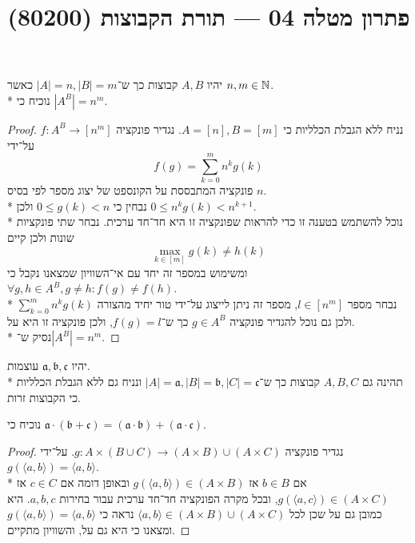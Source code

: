 
\title{פתרון מטלה 04 --- תורת הקבוצות (80200)}


\maketitle
\maketitleprint{}

\Question{}
יהיו $A, B$ קבוצות כך ש־$|A| = n, |B| = m$ כאשר $n, m \in \mathbb{N}$. \\*
נוכיח כי $|A^B| = n^m$.
\begin{proof}
	נניח ללא הגבלת הכלליות כי $A = [n], B = [m]$.
	נגדיר פונקציה $f : A^B \to [n^m]$ על־ידי
	\[
		f(g) = \sum_{k = 0}^{m} n^k g(k)
	\]
	פונקציה המתבססת על הקונספט של יצוג מספר לפי בסיס $n$. \\*
	נבחין כי $0 \le g(k) < n$ ולכן $0 \le n^k g(k) < n^{k + 1}$. \\*
	נוכל להשתמש בטענה זו כדי להראות שפונקציה זו היא חד־חד ערכית. נבחר שתי פונקציות שונות ולכן קיים
	\[
		\max_{k \in [m]} g(k) \ne h(k)
	\]
	ומשימוש במספר זה יחד עם אי־השוויון שמצאנו נקבל כי $\forall g, h \in A^B, g \ne h : f(g) \ne f(h)$. \\*
	נבחר מספר $l \in [n^m]$, מספר זה ניתן לייצוג על־ידי טור יחיד מהצורה $\sum_{k = 0}^{m} n^k g(k)$ ולכן גם נוכל להגדיר פונקציה $g \in A^B$ כך ש־$f(g) = l$, ולכן פונקציה זו היא על. \\*
	נסיק ש־$|A^B| = n^m$.
\end{proof}

\Question{}
יהיו $\mathfrak{a}, \mathfrak{b}, \mathfrak{c}$ עוצמות. \\*
תהינה גם $A, B, C$ קבוצות כך ש־$|A| = \mathfrak{a}, |B| = \mathfrak{b}, |C| = \mathfrak{c}$ ונניח גם ללא הגבלת הכלליות כי הקבוצות זרות.

\Subquestion{}
נוכיח כי $\mathfrak{a} \cdot (\mathfrak{b} + \mathfrak{c}) = (\mathfrak{a} \cdot \mathfrak{b}) + (\mathfrak{a} \cdot \mathfrak{c})$.
\begin{proof}
	נגדיר פונקציה $g : A \times (B \cup C) \to (A \times B) \cup (A \times C)$.
	על־ידי $g(\langle a, b \rangle) = \langle a, b \rangle$. \\*
	אם $b \in B$ אז $g(\langle a, b \rangle) \in (A \times B)$ ובאופן דומה אם $c \in C$ אז $g(\langle a, c \rangle) \in (A \times C)$, ובכל מקרה הפונקציה חד־חד ערכית עבור בחירות $a, b, c$.
	היא כמובן גם על שכן לכל $\langle a, b \rangle \in (A \times B) \cup (A \times C)$ נראה כי $g(\langle a, b \rangle) = \langle a, b \rangle$ ומצאנו כי היא גם על, והשוויון מתקיים.
\end{proof}

